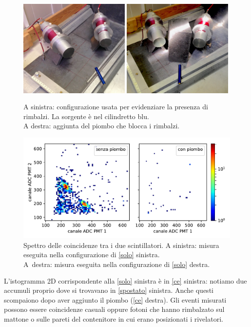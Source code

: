 \begin{figure}[h]
\centering
\subfloat
{\includegraphics[width=0.49\textwidth]{immagini/rimb.jpg}}
\hfill
\subfloat
{\includegraphics[width=0.49\textwidth]{immagini/norimb}}
\caption{\label{solo}
A sinistra:
configurazione usata per evidenziare la presenza di rimbalzi.
La sorgente è nel cilindretto blu.\\
A destra:
aggiunta del piombo che blocca i rimbalzi.}
\end{figure}

\begin{figure}[h]
\centering
\includegraphics[width=\textwidth]{immagini/rimb}
\caption{\label{ce}
Spettro delle coincidenze tra i due scintillatori.
A sinistra: misura eseguita nella configurazione di \autoref{solo} sinistra.\\
A~destra: misura eseguita nella configurazione di \autoref{solo} destra.}
\end{figure}

L'istogramma 2D corrispondente alla \autoref{solo} sinistra è in \autoref{ce} sinistra: notiamo due accumuli proprio dove si trovavano in \autoref{spostato} sinistra. Anche questi scompaiono dopo aver aggiunto il piombo (\autoref{ce} destra). Gli eventi misurati possono essere coincidenze casuali oppure fotoni che hanno rimbalzato sul mattone o sulle pareti del contenitore in cui erano posizionati i rivelatori.

